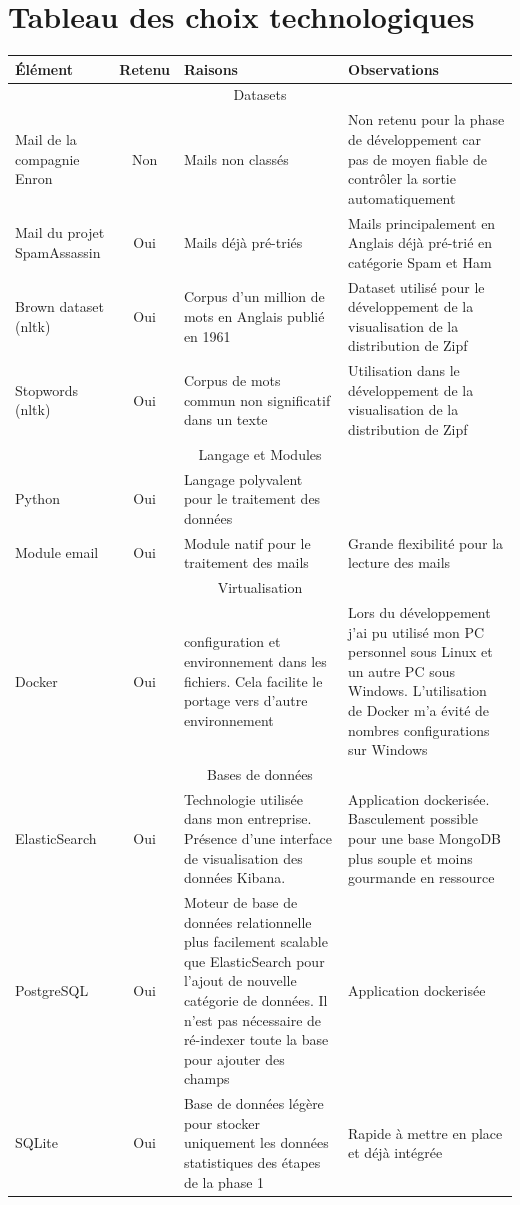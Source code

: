 \documentclass[a4paper,12pt]{article}
\begin{document}
\section{Tableau des choix technologiques}
	\begin{tabular}{|p{3cm}|c|p{4cm}|p{6cm}|}
		\hline
		Élément & Retenu & Raisons & Observations \\
		\hline
		
		\multicolumn{4}{|c|}{Datasets} \\
		\hline
		Mail de la compagnie Enron & Non & Mails non classés & Non retenu pour la phase de développement car pas de moyen fiable de contrôler la sortie automatiquement \\
		\hline
		Mail du projet SpamAssassin & Oui & Mails déjà pré-triés & Mails principalement en Anglais déjà pré-trié en catégorie Spam et Ham \\
		\hline
		Brown dataset (nltk) & Oui & Corpus d'un million de mots en Anglais publié en 1961 & Dataset utilisé pour le développement de la visualisation de la distribution de Zipf\\
		\hline
		Stopwords (nltk) & Oui & Corpus de mots commun non significatif dans un texte & Utilisation dans le développement de la visualisation de la distribution de Zipf\\
		\hline
		
		\multicolumn{4}{|c|}{Langage et Modules} \\
		\hline
		Python & Oui & Langage polyvalent pour le traitement des données & \\		
		\hline
		Module email & Oui & Module natif pour le traitement des mails & Grande flexibilité pour la lecture des mails \\
		\hline
		
		\multicolumn{4}{|c|}{Virtualisation} \\
		\hline
		Docker & Oui & configuration et environnement dans les fichiers. Cela facilite le portage vers d'autre environnement & Lors du développement j'ai pu utilisé mon PC personnel sous Linux et un autre PC sous Windows. L'utilisation de Docker m'a évité de nombres configurations sur Windows\\
		\hline
		
		\multicolumn{4}{|c|}{Bases de données} \\
		\hline
		ElasticSearch & Oui & Technologie utilisée dans mon entreprise. Présence d'une interface de visualisation des données Kibana. & Application dockerisée. Basculement possible pour une base MongoDB plus souple et moins gourmande en ressource \\
		\hline
		PostgreSQL & Oui & Moteur de base de données relationnelle plus facilement scalable que ElasticSearch pour l'ajout de nouvelle catégorie de données. Il n'est pas nécessaire de ré-indexer toute la base pour ajouter des champs & Application dockerisée\\
		\hline
		SQLite & Oui & Base de données légère pour stocker uniquement les données statistiques des étapes de la phase 1 & Rapide à mettre en place et déjà intégrée \\
		\hline		
		
		\hline
	\end{tabular}
	
\end{document}
